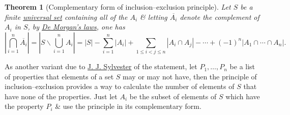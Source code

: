 \documentclass[oneside]{book}
\newtheorem{theorem}{Theorem}
\begin{document}
\begin{theorem}[Complementary form of inclusion--exclusion principle]
	Let $S$ be a finite \href{https://en.wikipedia.org/wiki/Universal_set}{universal set} containing all of the $A_i$ \& letting $\overline{A_i}$ denote the complement of $A_i$ in $S$, by \href{https://en.wikipedia.org/wiki/De_Morgan%27s_laws}{De Morgan's laws}, one has
	\begin{equation*}
		\left|\bigcap_{i=1}^n \overline{A_i}\right| = \left|S\backslash\bigcup_{i=1}^n A_i\right| = |S| - \sum_{i=1}^n |A_i| + \sum_{1\le i < j\le n} |A_i\cap A_j| - \cdots + (-1)^n|A_1\cap\cdots\cap A_n|.
	\end{equation*}	
\end{theorem}
As another variant due to \href{https://en.wikipedia.org/wiki/J._J._Sylvester}{\sc J. J. Sylvester} of the statement, let $P_1,\ldots,P_n$ be a list of properties that elements of a set $S$ may or may not have, then the principle of inclusion--exclusion provides a way to calculate the number of elements of $S$ that have none of the properties. Just let $A_i$ be the subset of elements of $S$ which have the property $P_i$ \& use the principle in its complementary form.
\end{document}
